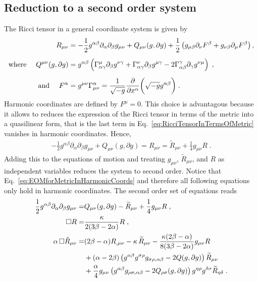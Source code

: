 \documentclass[a4paper,oneside,openany,11pt]{memoir}
\numberwithin{equation}{section} %
\begin{document}
\subsection{Reduction to a second order system}

The Ricci tensor in a general coordinate system is given by
\begin{align}
	\label{eq:RicciTensorInTermsOfMetric}
	R_{\mu\nu}&=-\frac{1}{2}g^{\alpha\beta}\partial_{\alpha}\partial_{\beta}g_{\mu\nu}+Q_{\mu\nu}(g,\partial g)+\frac{1}{2}
\left(g_{\mu\beta}\partial_\nu F^\beta+g_{\nu\beta}\partial_\mu F^\beta\right),
	\\[0.5em]\notag
	\text{where }\quad
	Q^{\mu\nu}(g,\partial g)&=g^{\alpha\beta}\left(\Gamma_{\alpha\gamma}^{\mu}\partial_{\beta} g^{\nu\gamma}+\Gamma_{\alpha\gamma}^{\nu}\partial_{\beta} g^{\mu\gamma}-2\Gamma_{\alpha\beta}^{\gamma}\partial_{\gamma} g^{\nu\mu}\right)\;,
	\\[0.5em]\notag
	\text{and }\quad
	F^\alpha &= g^{\mu\nu}\Gamma_{\mu\nu}^\alpha = \frac{1}{\sqrt{-g}}\frac{\partial}{\partial x^\alpha}\bigg(\sqrt{-g}g^{\alpha\beta}\bigg)\;.
\end{align}
Harmonic coordinates are defined by $F^{\mu} = 0$. This choice is advantagous because it allows to reduces the expression of the Ricci tensor in terms of the metric into a quasilinear form, that is the last term in Eq.~\eqref{eq:RicciTensorInTermsOfMetric} vanishes in harmonic coordinates. Hence, 
\begin{align}
	\label{eq:EOMforMetricInHarmonicCoords}
	-\frac{1}{2}g^{\alpha\beta}\partial_{\alpha}\partial_{\beta}g_{\mu\nu}+Q_{\mu\nu}(g,\partial g) = R_{\mu\nu} = \widetilde{R}_{\mu\nu}
+\frac{1}{4}g_{\mu\nu}R\;.
\end{align}
Adding this to the equations of motion and treating $g_{\mu\nu}$, $\widetilde{R}_{\mu\nu}$, and $R$ as independent variables reduces the system to second order. Notice that Eq.~\eqref{eq:EOMforMetricInHarmonicCoords} and therefore all following equations only hold in harmonic coordinates. The second order set of equations reads
\begin{align}
	\frac{1}{2}g^{\alpha\beta}\partial_{\alpha}\partial_{\beta}g_{\mu\nu} = &Q_{\mu\nu}(g,\partial g)-\widetilde{R}_{\mu\nu}
+\frac{1}{4}g_{\mu\nu}R\;,
	\\
	\square R = &\frac{\kappa}{2(3\beta-2\alpha)}R\;,
	\\
	\alpha\,\square \tilde{R}_{\mu\nu} = &
	(2\beta-\alpha) R_{,\mu\nu} - \kappa\,\widetilde{R}_{\mu\nu}
	-\frac{\kappa(2\beta-\alpha)}{8(3\beta-2\alpha)}g_{\mu\nu} R
	\notag\\
	&+ (\alpha-2\beta)\left(g^{\alpha\beta}g^{\sigma\rho}g_{\sigma\rho,\alpha\beta}-2Q(g,\partial g)\right)\widetilde{R}_{\mu\nu}
	\notag\\
	&+\frac{\alpha}{4} g_{\mu\nu}\left(g^{\alpha\beta}g_{\rho\sigma,\alpha\beta}-2Q_{\rho\sigma}(g,\partial g)\right)g^{\eta\rho}g^{\delta\sigma} \widetilde{R}_{\eta\delta}\;.
\end{align}
\end{document}
